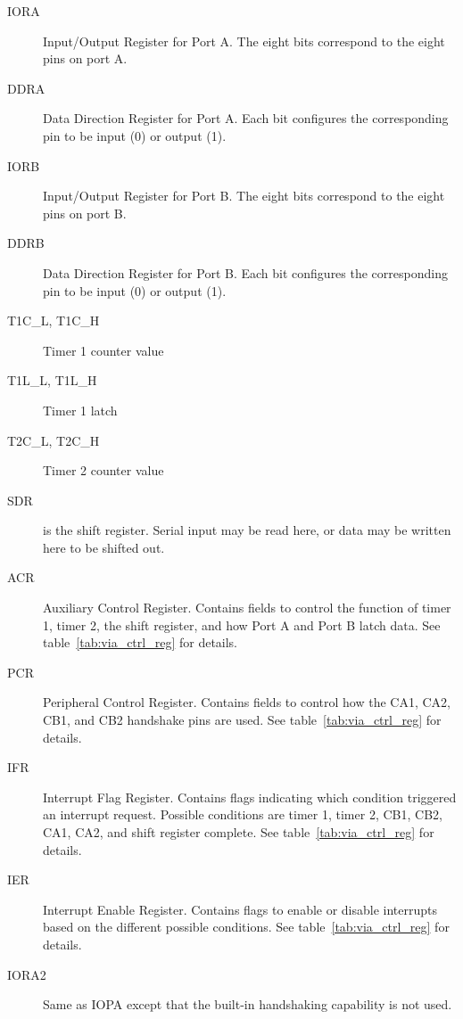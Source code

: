 \begin{description}
    \item[IORA] Input/Output Register for Port A. The eight bits correspond to the eight pins on port A.

    \item[DDRA] Data Direction Register for Port A. Each bit configures the corresponding pin to be input (0) or output (1).

    \item[IORB] Input/Output Register for Port B. The eight bits correspond to the eight pins on port B.

    \item[DDRB] Data Direction Register for Port B. Each bit configures the corresponding pin to be input (0) or output (1).

    \item[T1C\_L, T1C\_H] Timer 1 counter value

    \item[T1L\_L, T1L\_H] Timer 1 latch

    \item[T2C\_L, T2C\_H] Timer 2 counter value

    \item[SDR] is the shift register. Serial input may be read here, or data may be written here to be shifted out.

    \item[ACR] Auxiliary Control Register. Contains fields to control the function of timer 1, timer 2, the shift register, and how Port A and Port B latch data. See table~\ref{tab:via_ctrl_reg} for details.

    \item[PCR] Peripheral Control Register. Contains fields to control how the CA1, CA2, CB1, and CB2 handshake pins are used. See table~\ref{tab:via_ctrl_reg} for details.

    \item[IFR] Interrupt Flag Register. Contains flags indicating which condition triggered an interrupt request. Possible conditions are timer 1, timer 2, CB1, CB2, CA1, CA2, and shift register complete. See table~\ref{tab:via_ctrl_reg} for details.

    \item[IER] Interrupt Enable Register. Contains flags to enable or disable interrupts based on the different possible conditions. See table~\ref{tab:via_ctrl_reg} for details.

    \item[IORA2] Same as IOPA except that the built-in handshaking capability is not used.

\end{description}
